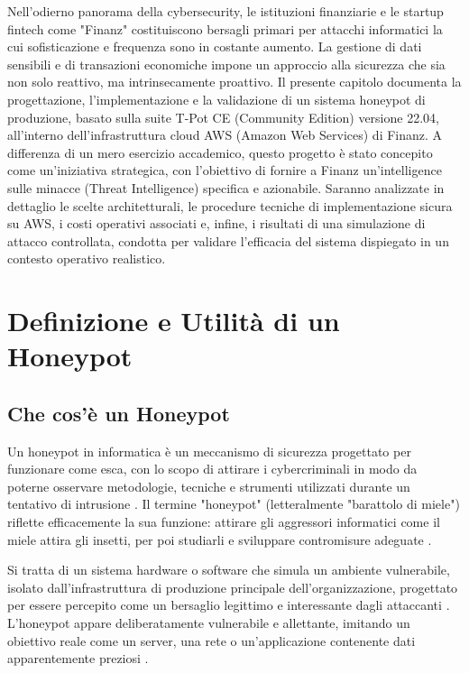 Nell'odierno panorama della cybersecurity, le istituzioni finanziarie e le startup fintech come "Finanz" costituiscono bersagli primari per attacchi informatici la cui sofisticazione e frequenza sono in costante aumento. La gestione di dati sensibili e di transazioni economiche impone un approccio alla sicurezza che sia non solo reattivo, ma intrinsecamente proattivo. Il presente capitolo documenta la progettazione, l'implementazione e la validazione di un sistema honeypot di produzione, basato sulla suite T-Pot CE (Community Edition) versione 22.04, all'interno dell'infrastruttura cloud AWS (Amazon Web Services) di Finanz. A differenza di un mero esercizio accademico, questo progetto è stato concepito come un'iniziativa strategica, con l'obiettivo di fornire a Finanz un'intelligence sulle minacce (Threat Intelligence) specifica e azionabile. Saranno analizzate in dettaglio le scelte architetturali, le procedure tecniche di implementazione sicura su AWS, i costi operativi associati e, infine, i risultati di una simulazione di attacco controllata, condotta per validare l'efficacia del sistema dispiegato in un contesto operativo realistico.
\section{Definizione e Utilità di un Honeypot}

\label{sec:def_utilita}



\subsection{Che cos'è un Honeypot}

\label{subsec:cos_e_honeypot}



Un honeypot in informatica è un meccanismo di sicurezza progettato per funzionare come esca, con lo scopo di attirare i cybercriminali in modo da poterne osservare metodologie, tecniche e strumenti utilizzati durante un tentativo di intrusione \cite{proofpoint2024}. Il termine "honeypot" (letteralmente "barattolo di miele") riflette efficacemente la sua funzione: attirare gli aggressori informatici come il miele attira gli insetti, per poi studiarli e sviluppare contromisure adeguate \cite{universeit2021}.



Si tratta di un sistema hardware o software che simula un ambiente vulnerabile, isolato dall'infrastruttura di produzione principale dell'organizzazione, progettato per essere percepito come un bersaglio legittimo e interessante dagli attaccanti \cite{mairh2011, perego_2023}. L'honeypot appare deliberatamente vulnerabile e allettante, imitando un obiettivo reale come un server, una rete o un'applicazione contenente dati apparentemente preziosi \cite{proofpoint2024, mairh2011}.



